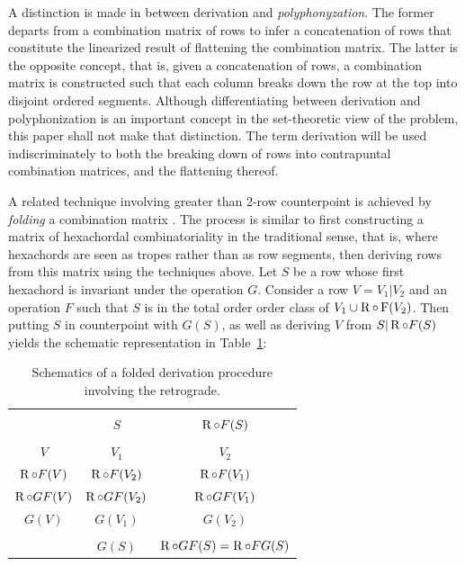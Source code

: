 A distinction is made in \cite[211, 214]{Starr1984} between derivation and \emph{polyphonyzation}. The former departs from a combination matrix of rows to infer a concatenation of rows that constitute the linearized result of flattening the combination matrix. The latter is the opposite concept, that is, given a concatenation of rows, a combination matrix is constructed such that each column breaks down the row at the top into disjoint ordered segments. Although differentiating between derivation and polyphonization is an important concept in the set-theoretic view of the problem, this paper shall not make that distinction. The term derivation will be used indiscriminately to both the breaking down of rows into contrapuntal combination matrices, and the flattening thereof.

A related technique involving greater than 2-row counterpoint is achieved by \emph{folding} a combination matrix \cite[215]{Starr1984}. The process is similar to first constructing a matrix of hexachordal combinatoriality in the traditional sense, that is, where hexachords are seen as tropes rather than as row segments, then deriving rows from this matrix using the techniques above. Let $S$ be a row whose first hexachord is invariant under the operation $G$. Consider a row $V = V_1 | V_2$ and an operation $F$ such that $S$ is in the total order order class of $V_1 \cup \operatorname{R} \circ \operatorname{F}(V_2)$. Then putting $S$ in counterpoint with $G(S)$, as well as deriving $V$ from $S | \operatorname{R}\circ F(S)$ yields the schematic representation in Table~\ref{derivation-folded}:

\begin{table}[htbp]
	\cite[215]{Starr1984}
    \caption[Folded Derivation Involving the Retrograde]{Schematics of a folded derivation procedure involving the retrograde.}
    \label{derivation-folded}
    \centering
    \vspace{12pt}
    \begin{tabular}{c|cc}
        \hline\\
        & $S$ & $\operatorname{R} \circ F(S)$\\
        \hline\\
        $V$ & $V_1$ & $V_2$ \\
        $\operatorname{R} \circ F(V)$ & $\operatorname{R} \circ F(V_2)$ & $\operatorname{R} \circ F(V_1)$ \\
        $\operatorname{R} \circ GF(V)$ & $\operatorname{R} \circ GF(V_2)$ & $\operatorname{R} \circ GF(V_1)$ \\
        $G(V)$ & $G(V_1)$ & $G(V_2)$ \\
        \hline\\
        & $G(S)$ & $\operatorname{R} \circ GF(S) = \operatorname{R} \circ FG(S)$ \\
        \hline
    \end{tabular}
\end{table}

